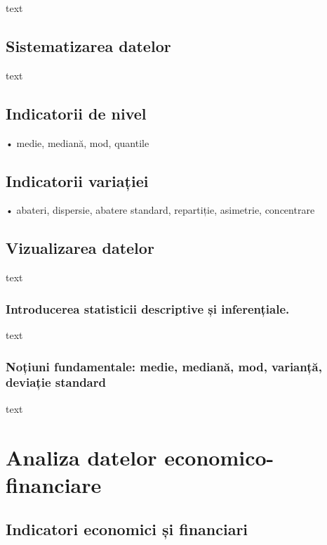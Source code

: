 \documentclass[
  11pt,
  b5paper,
  nottoc]{book}
\begin{document}
text

\section{Sistematizarea datelor}\label{sistematizarea-datelor}

text

\section{Indicatorii de nivel}\label{indicatorii-de-nivel}

• medie, mediană, mod, quantile

\section{Indicatorii variației}\label{indicatorii-variaux21biei}

• abateri, dispersie, abatere standard, repartiție, asimetrie,
concentrare

\section{Vizualizarea datelor}\label{vizualizarea-datelor}

text

\subsection{Introducerea statisticii descriptive și
inferențiale.}\label{introducerea-statisticii-descriptive-ux219i-inferenux21biale.}

text

\subsection{Noțiuni fundamentale: medie, mediană, mod, varianță,
deviație
standard}\label{noux21biuni-fundamentale-medie-medianux103-mod-varianux21bux103-deviaux21bie-standard}

text


\chapter{Analiza datelor economico-financiare}\label{cap3}

\section{Indicatori economici și
financiari}\label{indicatori-economici-ux219i-financiari}
\end{document}
